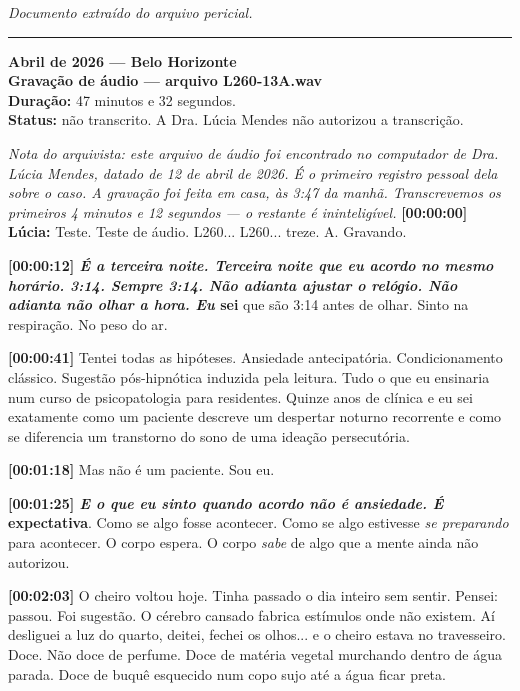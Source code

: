 
\noindent \textit{Documento extraído do arquivo pericial.}

\vspace{0.5em}\noindent\rule{\textwidth}{0.5pt}\vspace{0.5em}

\noindent \textbf{Abril de 2026 --- Belo Horizonte}\\
\noindent \textbf{Gravação de áudio --- arquivo L260-13A.wav}\\
\noindent \textbf{Duração:} 47 minutos e 32 segundos.\\
\noindent \textbf{Status:} não transcrito. A Dra. Lúcia Mendes não autorizou a transcrição.

\noindent \textit{Nota do arquivista: este arquivo de áudio foi encontrado no computador de Dra. Lúcia Mendes, datado de 12 de abril de 2026. É o primeiro registro pessoal dela sobre o caso. A gravação foi feita em casa, às 3:47 da manhã. Transcrevemos os primeiros 4 minutos e 12 segundos --- o restante é ininteligível.}
\noindent \textbf{[00:00:00] Lúcia:} Teste. Teste de áudio. L260... L260... treze. A. Gravando.

\noindent \textbf{[00:00:12]\textit{ É a terceira noite. Terceira noite que eu acordo no mesmo horário. 3:14. Sempre 3:14. Não adianta ajustar o relógio. Não adianta não olhar a hora. Eu }sei} que são 3:14 antes de olhar. Sinto na respiração. No peso do ar.

\noindent \textbf{[00:00:41]} Tentei todas as hipóteses. Ansiedade antecipatória. Condicionamento clássico. Sugestão pós-hipnótica induzida pela leitura. Tudo o que eu ensinaria num curso de psicopatologia para residentes. Quinze anos de clínica e eu sei exatamente como um paciente descreve um despertar noturno recorrente e como se diferencia um transtorno do sono de uma ideação persecutória.

\noindent \textbf{[00:01:18]} Mas não é um paciente. Sou eu.

\noindent \textbf{[00:01:25]\textit{ E o que eu sinto quando acordo não é ansiedade. É }expectativa}. Como se algo fosse acontecer. Como se algo estivesse \textit{se preparando} para acontecer. O corpo espera. O corpo \textit{sabe} de algo que a mente ainda não autorizou.

\noindent \textbf{[00:02:03]} O cheiro voltou hoje. Tinha passado o dia inteiro sem sentir. Pensei: passou. Foi sugestão. O cérebro cansado fabrica estímulos onde não existem. Aí desliguei a luz do quarto, deitei, fechei os olhos... e o cheiro estava no travesseiro. Doce. Não doce de perfume. Doce de matéria vegetal murchando dentro de água parada. Doce de buquê esquecido num copo sujo até a água ficar preta.


